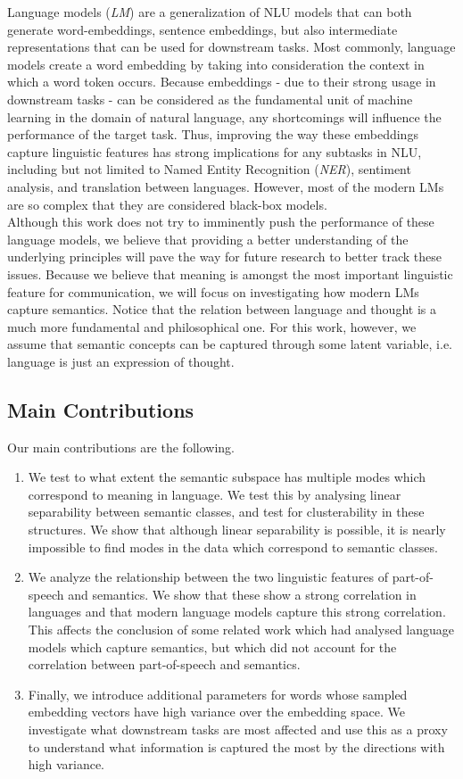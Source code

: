 \documentclass[a4paper,12pt,twoside,openright]{report}
\begin{document}
Language models (\textit{LM}) are a generalization of NLU models that can both generate word-embeddings, sentence embeddings, but also intermediate representations that can be used for downstream tasks.
Most commonly, language models create a word embedding by taking into consideration the context in which a word token occurs. 
Because embeddings - due to their strong usage in downstream tasks - can be considered as the fundamental unit of machine learning in the domain of natural language, any shortcomings will influence the performance of the target task.
Thus, improving the way these embeddings capture linguistic features has strong implications for any subtasks in NLU, including but not limited to Named Entity Recognition (\textit{NER}), sentiment analysis, and translation between languages. 
However, most of the modern LMs are so complex that they are considered black-box models.
\\

Although this work does not try to imminently push the performance of these language models, we believe that providing a better understanding of the underlying principles will pave the way for future research to better track these issues.
Because we believe that meaning is amongst the most important linguistic feature for communication, we will focus on investigating how modern LMs capture semantics. 
Notice that the relation between language and thought is a much more fundamental and philosophical one.
For this work, however, we assume that semantic concepts can be captured through some latent variable, i.e. language is just an expression of thought.


\subsection{Main Contributions}

Our main contributions are the following.

\begin{enumerate}
\item We test to what extent the semantic subspace has multiple modes which correspond to meaning in language.
We test this by analysing linear separability between semantic classes, and test for clusterability in these structures.
We show that although linear separability is possible, it is nearly impossible to find modes in the data which correspond to semantic classes.
\item We analyze the relationship between the two linguistic features of part-of-speech and semantics. 
We show that these show a strong correlation in languages and that modern language models capture this strong correlation.
This affects the conclusion of some related work which had analysed language models which capture semantics, but which did not account for the correlation between part-of-speech and semantics.
\item Finally, we introduce additional parameters for words whose sampled embedding vectors have high variance over the embedding space.
We investigate what downstream tasks are most affected  and use this as a proxy to understand what information is captured the most by the directions with high variance.
\end{enumerate} 
\end{document}
